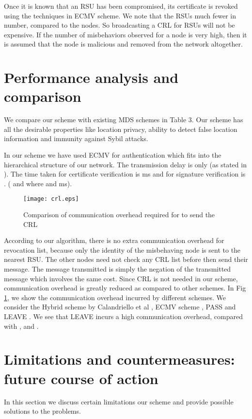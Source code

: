 \documentclass[conference]{IEEEtran}[10pt]
\begin{document}
Once it is known that an RSU has been compromised, its certificate is revoked using the techniques in ECMV scheme. 
We note that the RSUs much fewer in number, compared to the nodes. So
broadcasting a CRL for RSUs will not be expensive. 
If the number of misbehaviors observed for a node is very high, then it is assumed that the node is 
malicious and removed from the network altogether. 



\section{Performance analysis and comparison}
We compare our scheme with existing MDS schemes in Table 3. 
Our scheme has all the desirable 
properties like location  privacy, ability to detect false location information and immunity against Sybil attacks. 



In our scheme we have used ECMV \cite{WJS08} for authentication which fits into the hierarchical
structure of our network. 
The transmission delay is only  (as stated in \cite{WJS08}). 
The time taken for certificate verification is
ms and for signature verification is . 
( and  where  and ms). 

\begin{figure}[htb]
\begin{centering}
\texttt{[image: crl.eps]}
\caption{
Comparison of communication overhead required for to send the CRL}
\label{fig:compare}
\end{centering}
\end{figure}


According to our algorithm, there is no extra communication overhead for revocation list, because only the 
identity of the misbehaving node is sent to the nearest RSU. 
The other nodes need not check any CRL list before then send their message. 
The message transmitted is simply the negation of the transmitted message which involves the same cost. 
Since CRL is not needed in our scheme, communication overhead is greatly reduced as compared to other schemes. 
In Fig \ref{fig:compare}, we show the communication overhead incurred by different schemes. 
We consider the Hybrid scheme by Calandriello et al \cite{CPHL07}, ECMV scheme \cite{WJS08}, PASS \cite{SLLSS10} and LEAVE \cite{RPAJH07}. 
We see that LEAVE incurs a high communication overhead, compared with \cite{CPHL07}, \cite{WJS08} and \cite{SLLSS10}. 

\section{Limitations and countermeasures: future course of action}
\label{sec:limitations}
In this section we discuss certain limitations our scheme and provide possible solutions to the problems.
\end{document}
